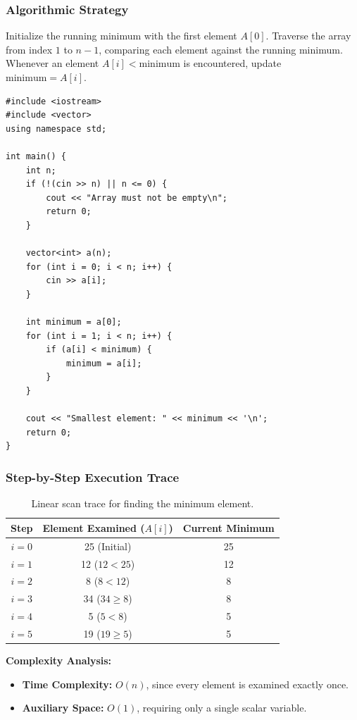 \subsubsection*{Algorithmic Strategy}
Initialize the running minimum with the first element $A[0]$. Traverse the array from index $1$ to $n-1$, comparing each element against the running minimum. Whenever an element $A[i] < \text{minimum}$ is encountered, update $\text{minimum} = A[i]$.

\begin{lstlisting}[style=cppstyle, caption={C++ Solution for Finding Minimum Element.}]
#include <iostream>
#include <vector>
using namespace std;

int main() {
    int n;
    if (!(cin >> n) || n <= 0) {
        cout << "Array must not be empty\n";
        return 0;
    }

    vector<int> a(n);
    for (int i = 0; i < n; i++) {
        cin >> a[i];
    }

    int minimum = a[0];
    for (int i = 1; i < n; i++) {
        if (a[i] < minimum) {
            minimum = a[i];
        }
    }

    cout << "Smallest element: " << minimum << '\n';
    return 0;
}
\end{lstlisting}

\subsubsection*{Step-by-Step Execution Trace}
\begin{table}[htbp]
\centering
\small
\begin{tabular}{c c c}
\toprule
\textbf{Step} & \textbf{Element Examined ($A[i]$)} & \textbf{Current Minimum} \\
\midrule
$i = 0$ & 25 (Initial) & 25 \\
$i = 1$ & 12 ($12 < 25$) & 12 \\
$i = 2$ & 8 ($8 < 12$) & 8 \\
$i = 3$ & 34 ($34 \geq 8$) & 8 \\
$i = 4$ & 5 ($5 < 8$) & 5 \\
$i = 5$ & 19 ($19 \geq 5$) & 5 \\
\bottomrule
\end{tabular}
\caption{Linear scan trace for finding the minimum element.}
\end{table}

\textbf{Complexity Analysis:}
\begin{itemize}
    \item \textbf{Time Complexity:} $O(n)$, since every element is examined exactly once.
    \item \textbf{Auxiliary Space:} $O(1)$, requiring only a single scalar variable.
\end{itemize}

